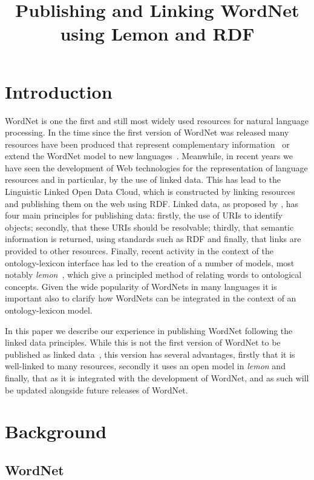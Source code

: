 \documentclass[10pt, a4paper]{article}
\title{Publishing and Linking WordNet using Lemon and RDF}
\newcommand{\lemon}[0]{\emph{lemon}}
\begin{document}
\maketitleabstract

\section{Introduction}

WordNet is one the first and still most widely used resources for natural
language processing. In the time since the first version of WordNet was released many
resources have been produced that represent complementary information~\cite{schuler2005verbnet,baker1998berkeley} or extend
the WordNet model to new languages~\cite{vossen1998eurowordnet,bond2013linking}. 
Meanwhile, in recent years we have seen
the development of Web technologies for the representation of language resources
and in particular, by the use of linked data. This has lead to the Linguistic Linked
Open Data Cloud, which is constructed by linking resources and publishing them
on the web using RDF. Linked data, as proposed by \cite{berners2011linked}, has four
main principles for publishing data: firstly, the use of URIs to identify
objects; secondly, that these URIs should be resolvable; thirdly, that semantic
information is returned, using standards such as RDF and finally, that links are
provided to other resources. 
Finally, recent activity in the context of the ontology-lexicon interface has
led to the creation of a number of models, most notably
\lemon{}~\cite{mccrae2012interchanging}, which give a principled method of
relating words to ontological concepts. Given the wide popularity of WordNets in
many languages it is important also to clarify how WordNets can be integrated in
the context of an ontology-lexicon model.


In this paper we describe our experience
in publishing WordNet following the linked data principles. While this is not
the first version of WordNet to be published as linked data~\cite{van2006conversion,mccrae2012integrating,graves2006data}, this
version has several advantages, firstly that it is well-linked to many
resources, secondly it uses an open model in \emph{lemon} and finally, that as
it is integrated with the development of WordNet, and as such will be updated alongside
future releases of WordNet.

\section{Background}

\subsection{WordNet}
\end{document}

